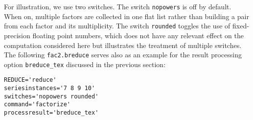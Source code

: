\documentclass[a4paper]{article}
\begin{document}
For illustration, we use two switches. The switch \texttt{nopowers} is
off by default. When on, multiple factors are collected in one flat
list rather than building a pair from each factor and its
multiplicity. The switch \texttt{rounded} toggles the use of
fixed-precision floating point numbers, which does not have any
relevant effect on the computation considered here but illustrates the
treatment of multiple switches. The following \texttt{fac2.breduce}
serves also as an example for the result processing option
\texttt{breduce\_tex} discussed in the previous section:
\begin{verbatim}
REDUCE='reduce'
seriesinstances='7 8 9 10'
switches='nopowers rounded'
command='factorize'
processresult='breduce_tex'
\end{verbatim}
\begin{figure}[t]
  \begin{center}
\end{center}
\end{figure}
\end{document}
